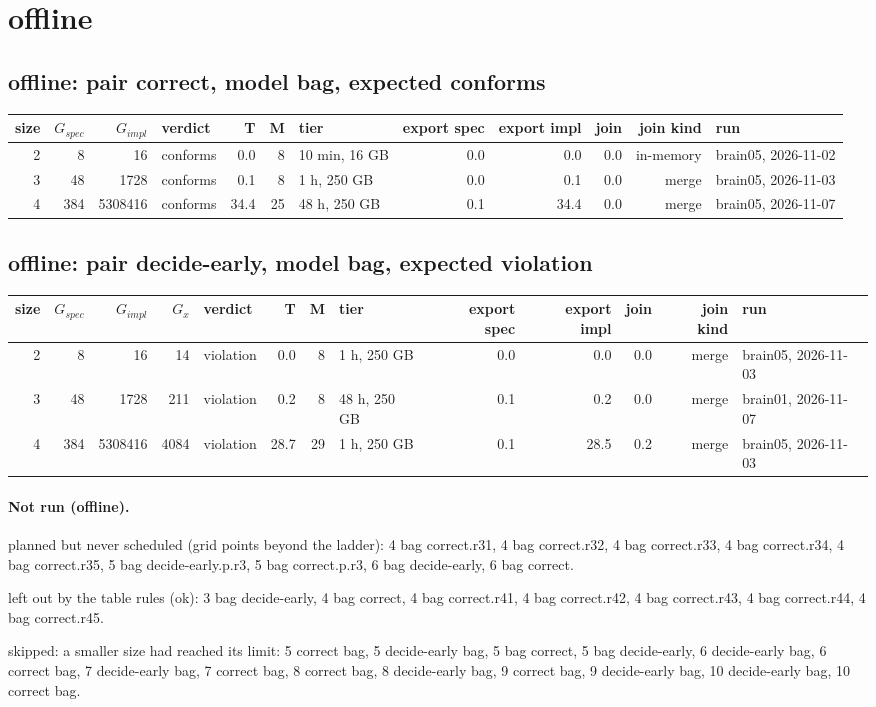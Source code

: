 \documentclass[10pt]{article}
\begin{document}
\section*{offline}
\subsection*{offline: pair \textsf{correct}, model bag, expected conforms}
\begin{longtable}{@{}rrrlrrlrrrrl@{}}
\toprule
size & $G_{\mathit{spec}}$ & $G_{\mathit{impl}}$ & verdict & T & M & tier & export spec & export impl & join & join kind & run \\
\midrule
\endhead
\color{red} 2 & 8 & 16 & conforms & 0.0 & 8 & 10 min, 16 GB & 0.0 & 0.0 & 0.0 & in-memory & brain05, 2026-11-02 \\
\color{blue} 3 & 48 & 1728 & conforms & 0.1 & 8 & 1 h, 250 GB & 0.0 & 0.1 & 0.0 & merge & brain05, 2026-11-03 \\
\color{blue} 4 & 384 & 5308416 & conforms & 34.4 & 25 & 48 h, 250 GB & 0.1 & 34.4 & 0.0 & merge & brain05, 2026-11-07 \\
\bottomrule
\end{longtable}
\subsection*{offline: pair \textsf{decide-early}, model bag, expected violation}
\begin{longtable}{@{}rrrrlrrlrrrrl@{}}
\toprule
size & $G_{\mathit{spec}}$ & $G_{\mathit{impl}}$ & $G_x$ & verdict & T & M & tier & export spec & export impl & join & join kind & run \\
\midrule
\endhead
\color{blue} 2 & 8 & 16 & 14 & violation & 0.0 & 8 & 1 h, 250 GB & 0.0 & 0.0 & 0.0 & merge & brain05, 2026-11-03 \\
\color{blue} 3 & 48 & 1728 & 211 & violation & 0.2 & 8 & 48 h, 250 GB & 0.1 & 0.2 & 0.0 & merge & brain01, 2026-11-07 \\
\color{blue} 4 & 384 & 5308416 & 4084 & violation & 28.7 & 29 & 1 h, 250 GB & 0.1 & 28.5 & 0.2 & merge & brain05, 2026-11-03 \\
\bottomrule
\end{longtable}
\paragraph{Not run (offline).}
planned but never scheduled (grid points beyond the ladder): 4 bag correct.r31, 4 bag correct.r32, 4 bag correct.r33, 4 bag correct.r34, 4 bag correct.r35, 5 bag decide-early.p.r3, 5 bag correct.p.r3, 6 bag decide-early, 6 bag correct.\par
left out by the table rules (ok): 3 bag decide-early, 4 bag correct, 4 bag correct.r41, 4 bag correct.r42, 4 bag correct.r43, 4 bag correct.r44, 4 bag correct.r45.\par
skipped: a smaller size had reached its limit: 5 correct bag, 5 decide-early bag, 5 bag correct, 5 bag decide-early, 6 decide-early bag, 6 correct bag, 7 decide-early bag, 7 correct bag, 8 correct bag, 8 decide-early bag, 9 correct bag, 9 decide-early bag, 10 decide-early bag, 10 correct bag.\par
\end{document}
